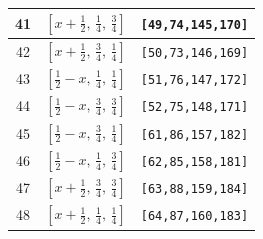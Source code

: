 \documentclass[fleqn,8pt]{jsarticle}
\begin{document}
\begin{longtable}{ccc}
41 & $\left[ x + \frac{1}{2},\, \frac{1}{4},\, \frac{3}{4} \right]$ & {\tt [49,74,145,170]} \\ \hline
42 & $\left[ x + \frac{1}{2},\, \frac{3}{4},\, \frac{1}{4} \right]$ & {\tt [50,73,146,169]} \\ \hline
43 & $\left[ \frac{1}{2} - x,\, \frac{1}{4},\, \frac{1}{4} \right]$ & {\tt [51,76,147,172]} \\ \hline
44 & $\left[ \frac{1}{2} - x,\, \frac{3}{4},\, \frac{3}{4} \right]$ & {\tt [52,75,148,171]} \\ \hline
45 & $\left[ \frac{1}{2} - x,\, \frac{3}{4},\, \frac{1}{4} \right]$ & {\tt [61,86,157,182]} \\ \hline
46 & $\left[ \frac{1}{2} - x,\, \frac{1}{4},\, \frac{3}{4} \right]$ & {\tt [62,85,158,181]} \\ \hline
47 & $\left[ x + \frac{1}{2},\, \frac{3}{4},\, \frac{3}{4} \right]$ & {\tt [63,88,159,184]} \\ \hline
48 & $\left[ x + \frac{1}{2},\, \frac{1}{4},\, \frac{1}{4} \right]$ & {\tt [64,87,160,183]} \\
\end{longtable}
\renewcommand{\arraystretch}{1.2}
\end{document}
